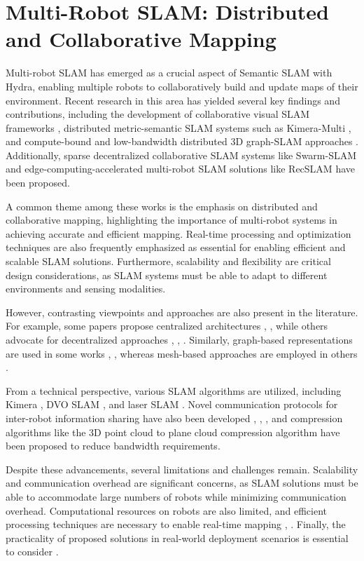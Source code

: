 \documentclass[conference]{IEEEtran}
\begin{document}
\section{Multi-Robot SLAM: Distributed and Collaborative Mapping}
Multi-robot SLAM has emerged as a crucial aspect of Semantic SLAM with Hydra, enabling multiple robots to collaboratively build and update maps of their environment. Recent research in this area has yielded several key findings and contributions, including the development of collaborative visual SLAM frameworks \cite{b1}, distributed metric-semantic SLAM systems such as Kimera-Multi \cite{b2}, and compute-bound and low-bandwidth distributed 3D graph-SLAM approaches \cite{b3}. Additionally, sparse decentralized collaborative SLAM systems like Swarm-SLAM \cite{b4} and edge-computing-accelerated multi-robot SLAM solutions like RecSLAM \cite{b5} have been proposed.

A common theme among these works is the emphasis on distributed and collaborative mapping, highlighting the importance of multi-robot systems in achieving accurate and efficient mapping. Real-time processing and optimization techniques are also frequently emphasized as essential for enabling efficient and scalable SLAM solutions. Furthermore, scalability and flexibility are critical design considerations, as SLAM systems must be able to adapt to different environments and sensing modalities.

However, contrasting viewpoints and approaches are also present in the literature. For example, some papers propose centralized architectures \cite{b1}, \cite{b5}, while others advocate for decentralized approaches \cite{b2}, \cite{b3}, \cite{b4}. Similarly, graph-based representations are used in some works \cite{b2}, \cite{b3}, whereas mesh-based approaches are employed in others \cite{b5}.

From a technical perspective, various SLAM algorithms are utilized, including Kimera \cite{b2}, DVO SLAM \cite{b3}, and laser SLAM \cite{b5}. Novel communication protocols for inter-robot information sharing have also been developed \cite{b1}, \cite{b2}, \cite{b4}, and compression algorithms like the 3D point cloud to plane cloud compression algorithm \cite{b3} have been proposed to reduce bandwidth requirements.

Despite these advancements, several limitations and challenges remain. Scalability and communication overhead are significant concerns, as SLAM solutions must be able to accommodate large numbers of robots while minimizing communication overhead. Computational resources on robots are also limited, and efficient processing techniques are necessary to enable real-time mapping \cite{b1}, \cite{b5}. Finally, the practicality of proposed solutions in real-world deployment scenarios is essential to consider \cite{b5}.
\end{document}
